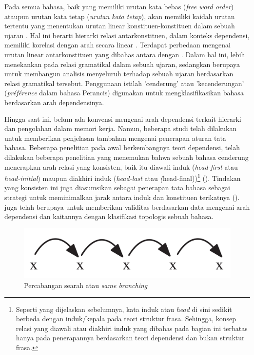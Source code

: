 Pada semua bahasa, baik yang memiliki urutan kata bebas (\textit{free word order}) ataupun urutan kata tetap (\textit{urutan kata tetap}), akan memiliki kaidah urutan tertentu yang menentukan urutan linear konstituen-konstituen dalam sebuah ujaran \citep{tesniere1959elements}. Hal ini berarti hierarki relasi antarkonstituen, dalam konteks dependensi, memiliki korelasi dengan arah secara linear \citep{greenberg1963some}. Terdapat perbedaan mengenai urutan linear antarkonstituen yang dibahas antara \cite{tesniere1959elements} dengan \cite{greenberg1963some}.  Dalam hal ini, \cite{greenberg1963some} lebih menekankan pada relasi gramatikal dalam sebuah ujaran, sedangkan \cite{tesniere1959elements} berupaya untuk membangun analisis menyeluruh terhadap sebuah ujaran berdasarkan relasi gramatikal tersebut. Penggunaan istilah 'cenderung' atau 'kecenderungan' (\textit{pr{\'e}f{\'e}rence} dalam bahasa Perancis) digunakan \cite{tesniere1959elements} untuk mengklasifikasikan bahasa berdasarkan arah dependensinya.

Hingga saat ini, belum ada konvensi mengenai arah dependensi terkait hierarki dan pengolahan dalam memori kerja. Namun, beberapa studi telah dilakukan untuk memberikan penjelasan tambahan mengenai penerapan aturan tata bahasa. Beberapa penelitian pada awal berkembangnya teori dependensi, telah dilakukan beberapa penelitian yang menemukan bahwa sebuah bahasa cenderung menerapkan arah relasi yang konsisten, baik itu diawali induk (\textit{head-first} atau \textit{head-initial}) maupun diakhiri induk (\textit{head-last} atau \textit(head-final))\footnote{Seperti yang dijelaskan sebelumnya, kata induk atau \textit{head} di sini sedikit berbeda dengan induk/kepala pada teori struktur frasa. Sehingga, konsep relasi yang diawali atau diakhiri induk yang dibahas pada bagian ini terbatas hanya pada penerapannya berdasarkan teori dependensi dan bukan struktur frasa.} (\citealp{hawkins1994performance, radford1997syntactic, vennemann1994linguistic}). Tindakan yang konsisten ini juga diasumsikan sebagai penerapan tata bahasa sebagai strategi untuk meminimalkan jarak antara induk dan konstituen terikatnya (\citealp{hawkins1994performance, frazier1985syntactic}). \cite{liu2010dependency} juga telah berupaya untuk memberikan validitas berdasarkan data mengenai arah dependensi dan kaitannya dengan klasifikasi topologis sebuah bahasa.

\begin{figure}
	\centering \includegraphics[width=0.5
	\textwidth] {pics/samebranching.png} \caption{Percabangan searah atau \textit{same branching}} 
\label{fig:samebranching} \end{figure}

